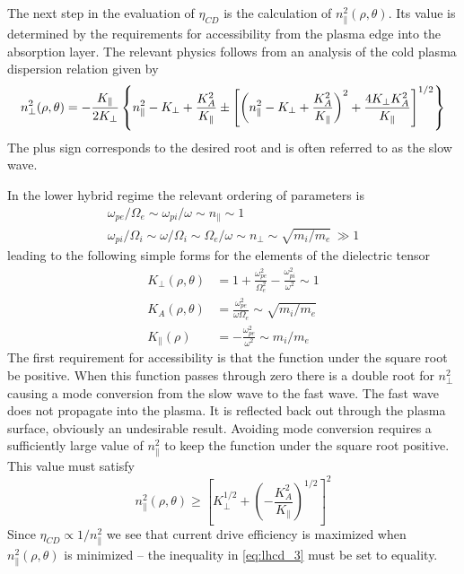 The next step in the evaluation of $\eta_{CD}$ is the calculation of $n_\parallel^2(\rho,\theta)$. Its value is determined by the requirements for accessibility from the plasma edge into the absorption layer. The relevant physics follows from an analysis of the cold plasma dispersion relation given by
\begin{equation}
\small
\label{eq:lhcd_4}
n _ { \perp } ^ { 2 } ( \rho , \theta ) = - \frac { K _ { \| } } { 2 K _ { \perp } } \left\{ n _ { \| } ^ { 2 } - K _ { \perp } + \frac { K _ { A } ^ { 2 } } { K _ { \| } } \pm \left[ \left( n _ { \| } ^ { 2 } - K _ { \perp } + \frac { K _ { A } ^ { 2 } } { K _ { \| } } \right) ^ { 2 } + \frac { 4 K _ { \perp } K _ { A } ^ { 2 } } { K _ { \| } } \right] ^ { 1 / 2 } \right\}
\end{equation}
The plus sign corresponds to the desired root and is often referred to as the slow wave.

In the lower hybrid regime the relevant ordering of parameters is
\begin{equation}
\begin{array} { c } { \omega _ { p e } / \Omega _ { e } \sim \omega _ { p i } / \omega \sim n _ { \| } \sim 1 } \\ { \omega _ { p i } / \Omega _ { i } \sim \omega / \Omega _ { i } \sim \Omega _ { e } / \omega \sim n _ { \perp } \sim \sqrt{ m _ { i } / m _ { e } }  \, \gg 1 } \end{array}
\end{equation}
leading to the following simple forms for the elements of the dielectric tensor
\begin{equation}
	\begin{aligned} K _ { \perp } ( \rho , \theta ) & = 1 + \frac { \omega _ { p e } ^ { 2 } } { \Omega _ { e } ^ { 2 } } - \frac { \omega _ { p i } ^ { 2 } } { \omega ^ { 2 } } \sim 1 \\ K _ { A } ( \rho , \theta ) & = \frac { \omega _ { p e } ^ { 2 } } { \omega \Omega _ { e } } \sim \sqrt{ m _ { i } / m _ { e } } \\ K _ { \| } ( \rho ) & = - \frac { \omega _ { p e } ^ { 2 } } { \omega ^ { 2 } } \sim m _ { i } / m _ { e } \end{aligned}
\end{equation}
The first requirement for accessibility is that the function under the square root be positive. When this function passes through zero there is a double root for $n_\perp^2$ causing a mode conversion from the slow wave to the fast wave. The fast wave does not propagate into the plasma. It is reflected back out through the plasma surface, obviously an undesirable result. Avoiding mode conversion requires a sufficiently large value of $n_\parallel^2$ to keep the function under the square root positive. This value must satisfy
\begin{equation}
	\label{eq:lhcd_3}
	n _ { \| } ^ { 2 } ( \rho , \theta ) \geq \left[ K _ { \perp } ^ { 1 / 2 } + \left( - \frac { K _ { A } ^ { 2 } } { K _ { \| } } \right) ^ { 1 / 2 } \right] ^ { 2 }
\end{equation}
Since $\eta_{CD} \propto 1 / n_\parallel^2$ we see that current drive efficiency is maximized when $n_\parallel^2(\rho,\theta)$ is minimized -- the inequality in \cref{eq:lhcd_3} must be set to equality.

